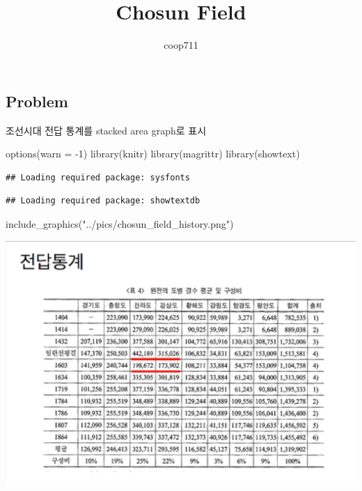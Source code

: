 \documentclass[
]{article}
\title{Chosun Field}
\author{coop711}
\date{}
\newenvironment{Shaded}{\begin{snugshade}}{\end{snugshade}}
\newcommand{\AttributeTok}[1]{\textcolor[rgb]{0.77,0.63,0.00}{#1}}
\newcommand{\DecValTok}[1]{\textcolor[rgb]{0.00,0.00,0.81}{#1}}
\newcommand{\FunctionTok}[1]{\textcolor[rgb]{0.00,0.00,0.00}{#1}}
\newcommand{\NormalTok}[1]{#1}
\newcommand{\SpecialCharTok}[1]{\textcolor[rgb]{0.00,0.00,0.00}{#1}}
\newcommand{\StringTok}[1]{\textcolor[rgb]{0.31,0.60,0.02}{#1}}
\begin{document}
\maketitle

\hypertarget{problem}{%
\subsection{Problem}\label{problem}}

조선시대 전답 통계를 stacked area graph로 표시

\begin{Shaded}
\begin{Highlighting}[]
\FunctionTok{options}\NormalTok{(}\AttributeTok{warn =} \SpecialCharTok{{-}}\DecValTok{1}\NormalTok{)}
\FunctionTok{library}\NormalTok{(knitr)}
\FunctionTok{library}\NormalTok{(magrittr)}
\FunctionTok{library}\NormalTok{(showtext)}
\end{Highlighting}
\end{Shaded}

\begin{verbatim}
## Loading required package: sysfonts
\end{verbatim}

\begin{verbatim}
## Loading required package: showtextdb
\end{verbatim}

\begin{Shaded}
\begin{Highlighting}[]
\FunctionTok{include\_graphics}\NormalTok{(}\StringTok{"../pics/chosun\_field\_history.png"}\NormalTok{)}
\end{Highlighting}
\end{Shaded}

\includegraphics[width=0.8\linewidth]{../pics/chosun_field_history}
\end{document}
